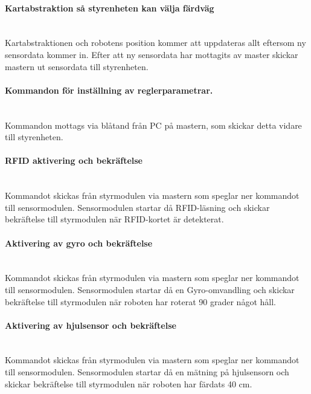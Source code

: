 \documentclass[a4paper,12pt,fleqn]{article}
\begin{document}
\paragraph{Kartabstraktion så styrenheten kan välja färdväg}
~\\
Kartabstraktionen och robotens position kommer att uppdateras allt eftersom ny sensordata kommer in. Efter att ny sensordata har mottagits av master skickar mastern ut sensordata till styrenheten.
\paragraph{Kommandon för inställning av reglerparametrar.}
~\\
Kommandon mottags via blåtand från PC på mastern, som skickar detta vidare till styrenheten. 
\paragraph{RFID aktivering och bekräftelse}
~\\
Kommandot skickas från styrmodulen via mastern som speglar ner kommandot till sensormodulen. Sensormodulen startar då RFID-läsning och skickar bekräftelse till styrmodulen när RFID-kortet är detekterat.  

\paragraph{Aktivering av gyro och bekräftelse}
~\\
Kommandot skickas från styrmodulen via mastern som speglar ner kommandot till sensormodulen. Sensormodulen startar då en Gyro-omvandling och skickar bekräftelse till styrmodulen när roboten har roterat 90 grader något håll. 

\paragraph{Aktivering av hjulsensor och bekräftelse}
~\\
Kommandot skickas från styrmodulen via mastern som speglar ner kommandot till sensormodulen. Sensormodulen startar då en mätning på hjulsensorn och skickar bekräftelse till styrmodulen när roboten har färdats 40 cm. 
\end{document}
